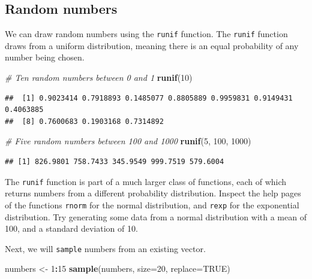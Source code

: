 \documentclass[]{book}
\newenvironment{Shaded}{\begin{snugshade}}{\end{snugshade}}
\newcommand{\CommentTok}[1]{\textcolor[rgb]{0.56,0.35,0.01}{\textit{#1}}}
\newcommand{\DataTypeTok}[1]{\textcolor[rgb]{0.13,0.29,0.53}{#1}}
\newcommand{\DecValTok}[1]{\textcolor[rgb]{0.00,0.00,0.81}{#1}}
\newcommand{\KeywordTok}[1]{\textcolor[rgb]{0.13,0.29,0.53}{\textbf{#1}}}
\newcommand{\NormalTok}[1]{#1}
\newcommand{\OperatorTok}[1]{\textcolor[rgb]{0.81,0.36,0.00}{\textbf{#1}}}
\newcommand{\OtherTok}[1]{\textcolor[rgb]{0.56,0.35,0.01}{#1}}
\newcommand{\StringTok}[1]{\textcolor[rgb]{0.31,0.60,0.02}{#1}}
\let\BeginKnitrBlock\begin \let\EndKnitrBlock\end
\begin{document}
\hypertarget{randomnumbers}{%
\subsection{Random numbers}\label{randomnumbers}}

We can draw random numbers using the \texttt{runif} function. The \texttt{runif} function draws from a uniform distribution, meaning there is an equal probability of any number being chosen.

\begin{Shaded}
\begin{Highlighting}[]
\CommentTok{# Ten random numbers between 0 and 1}
\KeywordTok{runif}\NormalTok{(}\DecValTok{10}\NormalTok{)}
\end{Highlighting}
\end{Shaded}

\begin{verbatim}
##  [1] 0.9023414 0.7918893 0.1485077 0.8805889 0.9959831 0.9149431 0.4063885
##  [8] 0.7600683 0.1903168 0.7314892
\end{verbatim}

\begin{Shaded}
\begin{Highlighting}[]
\CommentTok{# Five random numbers between 100 and 1000}
\KeywordTok{runif}\NormalTok{(}\DecValTok{5}\NormalTok{, }\DecValTok{100}\NormalTok{, }\DecValTok{1000}\NormalTok{)}
\end{Highlighting}
\end{Shaded}

\begin{verbatim}
## [1] 826.9801 758.7433 345.9549 999.7519 579.6004
\end{verbatim}

\BeginKnitrBlock{rmdtry}
The \texttt{runif} function is part of a much larger class of functions, each of which returns
numbers from a different probability distribution. Inspect the help pages of the functions \texttt{rnorm}
for the normal distribution, and \texttt{rexp} for the exponential distribution. Try generating some data from a normal distribution with a mean of 100, and a standard deviation of 10.
\EndKnitrBlock{rmdtry}

Next, we will \texttt{sample} numbers from an existing vector.

\begin{Shaded}
\begin{Highlighting}[]
\NormalTok{numbers <-}\StringTok{ }\DecValTok{1}\OperatorTok{:}\DecValTok{15}
\KeywordTok{sample}\NormalTok{(numbers, }\DataTypeTok{size=}\DecValTok{20}\NormalTok{, }\DataTypeTok{replace=}\OtherTok{TRUE}\NormalTok{)}
\end{Highlighting}
\end{Shaded}
\end{document}
